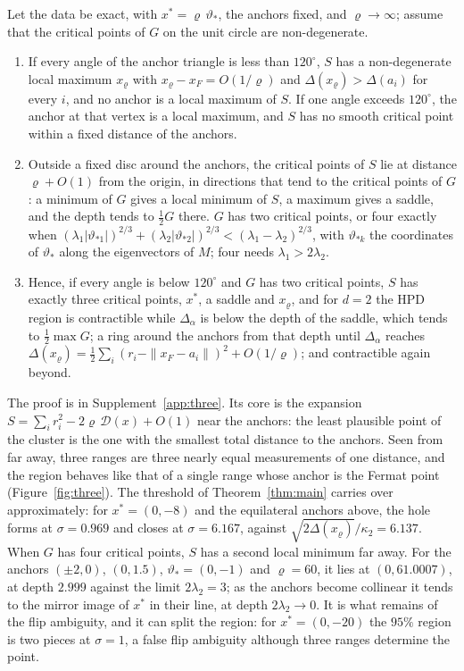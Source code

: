 \begin{theorem}\label{thm:far}
Let the data be exact, with $x^* = \varrho\,\vartheta_*$, the anchors fixed, and $\varrho \to \infty$; assume that the critical
points of $G$ on the unit circle are non-degenerate.
\begin{enumerate}[label=(\roman*)]
\item If every angle of the anchor triangle is less than $120^\circ$, $S$ has a non-degenerate local maximum $x_\varrho$
with $x_\varrho - x_F = O(1/\varrho)$ and $\Delta(x_\varrho) > \Delta(a_i)$ for every $i$, and no anchor is a local maximum of $S$.
If one angle exceeds $120^\circ$, the anchor at that vertex is a local maximum, and $S$ has no smooth critical point
within a fixed distance of the anchors.
\item Outside a fixed disc around the anchors, the critical points of $S$ lie at distance $\varrho + O(1)$ from the origin,
in directions that tend to the critical points of $G$: a minimum of $G$ gives a local minimum of $S$, a maximum gives a
saddle, and the depth tends to $\frac12 G$ there. $G$ has two critical points, or four exactly when
$(\lambda_1|\vartheta_{*1}|)^{2/3} + (\lambda_2|\vartheta_{*2}|)^{2/3} < (\lambda_1 - \lambda_2)^{2/3}$, with $\vartheta_{*k}$ the
coordinates of $\vartheta_*$ along the eigenvectors of $M$; four needs $\lambda_1 > 2\lambda_2$.
\item Hence, if every angle is below $120^\circ$ and $G$ has two critical points, $S$ has exactly three critical points,
$x^*$, a saddle and $x_\varrho$, and for $d = 2$ the HPD region is contractible while $\Delta_\alpha$ is below the depth of
the saddle, which tends to $\frac12\max G$; a ring around the anchors from that depth until $\Delta_\alpha$ reaches
$\Delta(x_\varrho) = \frac12\sum_i(r_i - \|x_F - a_i\|)^2 + O(1/\varrho)$; and contractible again beyond.
\end{enumerate}
\end{theorem}

The proof is in Supplement~\ref{app:three}. Its core is the expansion
$S = \sum_i r_i^2 - 2\varrho\,\mathcal D(x) + O(1)$ near the anchors: the least plausible point of the cluster is the one with
the smallest total distance to the anchors. Seen from far away, three ranges are three nearly equal measurements of one
distance, and the region behaves like that of a single range whose anchor is the Fermat point (Figure~\ref{fig:three}).
The threshold of Theorem~\ref{thm:main} carries over approximately: for $x^* = (0, -8)$ and the equilateral anchors above,
the hole forms at $\sigma = 0.969$ and closes at $\sigma = 6.167$, against $\sqrt{2\Delta(x_\varrho)}/\kappa_2 = 6.137$. When $G$
has four critical points, $S$ has a second local minimum far away. For the anchors $(\pm2, 0)$, $(0, 1.5)$,
$\vartheta_* = (0, -1)$ and $\varrho = 60$, it lies at $(0, 61.0007)$, at depth $2.999$ against the limit $2\lambda_2 = 3$; as the
anchors become collinear it tends to the mirror image of $x^*$ in their line, at depth $2\lambda_2 \to 0$. It is what
remains of the flip ambiguity, and it can split the region: for $x^* = (0, -20)$ the $95\%$ region is two pieces at
$\sigma = 1$, a false flip ambiguity although three ranges determine the point.

